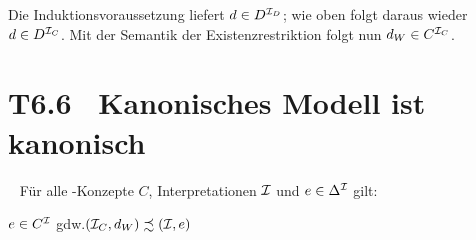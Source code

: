 \documentclass[fontsize=11pt, twoside=false, numbers=autoenddot]{scrbook}
\begin{document}
\begin{description}
\begin{description}
\begin{center}
%
          \end{center}
          \parI
          Die Induktionsvoraussetzung liefert $d \in D^{\mathcal{I}_D}$;
          wie oben folgt daraus wieder $d \in D^{\mathcal{I}_C}$.
          Mit der Semantik der Existenzrestriktion folgt nun $d_W \in C^{\mathcal{I}_C}$.
          \qedhere
      \end{description}
  \end{description}

\section*{T6.6~ Kanonisches Modell ist kanonisch}

~
Für alle \EL-Konzepte $C$, Interpretationen $\mathcal{I}$ und $e \in \Delta^\mathcal{I}$ gilt:
%
\begin{center}
  $e \in C^\mathcal{I}$ \quad gdw.\quad $(\mathcal{I}_C,d_W) \precsim (\mathcal{I},e)$
\end{center}
\end{document}
